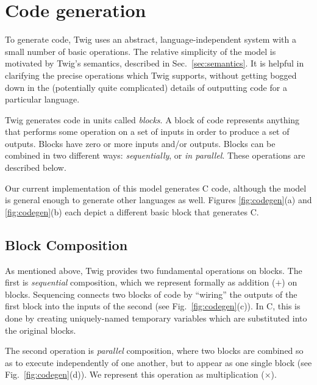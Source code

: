 
\section{Code generation}
\label{sec:code-gen}

To generate code, Twig uses an abstract, language-independent
system with a small number of basic operations. The relative
simplicity of the model is motivated by Twig's semantics,
described in Sec.~\ref{sec:semantics}. It is helpful in clarifying
the precise operations which Twig supports, without getting bogged
down in the (potentially quite complicated) details of outputting
code for a particular language.

Twig generates code in units called \emph{blocks}. A block of code
represents anything that performs some operation on a set of
inputs in order to produce a set of outputs. Blocks have zero or
more inputs and/or outputs. Blocks can be combined in two
different ways: \emph{sequentially}, or \emph{in parallel}. These
operations are described below.

Our current implementation of this model generates C code,
although the model is general enough to generate other languages
as well. Figures \ref{fig:codegen}(a) and \ref{fig:codegen}(b)
each depict a different basic block that generates C.

\subsection{Block Composition}

As mentioned above, Twig provides two fundamental operations on
blocks. The first is \emph{sequential} composition, which we
represent formally as addition ($+$) on blocks. Sequencing
connects two blocks of code by ``wiring'' the outputs of the first
block into the inputs of the second (see
Fig.~\ref{fig:codegen}(c)). In C, this is done by creating
uniquely-named temporary variables which are substituted into the
original blocks.

The second operation is \emph{parallel} composition, where two
blocks are combined so as to execute independently of one another,
but to appear as one single block (see Fig.~\ref{fig:codegen}(d)).
We represent this operation as multiplication ($\times$).

